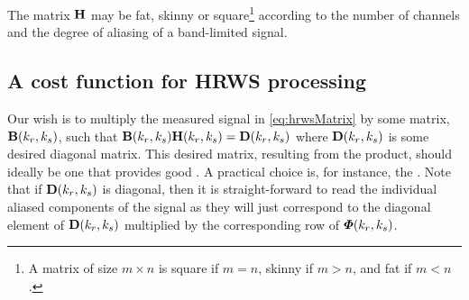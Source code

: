The matrix $\antennaMatrix$ may be fat, skinny or square\footnote{A matrix of size $m\times n$ is square if $m=n$, skinny if $m>n$, and fat if $m<n$.} according to the number of channels and the degree of aliasing of a band-limited signal.
\subsection{A cost function for HRWS processing}
Our wish is to multiply the measured signal in \eqref{eq:hrwsMatrix} by some matrix, $\hrwsFilterMatrix(\kargs)$, such that $\hrwsFilterMatrix(\kargs)\antennaMatrix(\kargs) = \diagAntennaMatrix(\kargs)$ where $\diagAntennaMatrix(\kargs)$ is some desired diagonal matrix. This desired matrix, resulting from the product, should ideally be one that provides good . A practical choice is, for instance, the .  
Note that if $\diagAntennaMatrix(\kargs)$ is diagonal, then it is straight-forward to read the individual aliased components of the signal as they will just correspond to the diagonal element of $\diagAntennaMatrix(\kargs)$ multiplied by the corresponding row of $\boldsymbol{\varPhi}(k_r,k_{s})$.
\par
